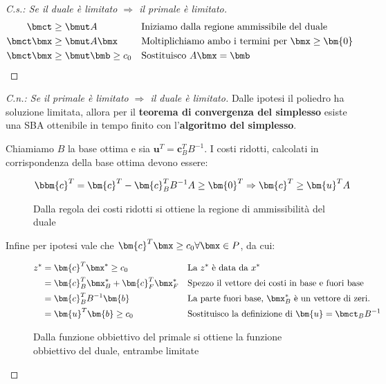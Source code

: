 \documentclass[\main/main.tex]{subfiles}
\begin{document}
\begin{proof}[C.s.: Se il duale è limitato $\Rightarrow$ il primale è limitato]
  \begin{align*}
    \bmct     & \geq \bmut A             &  & \text{Iniziamo dalla regione ammissibile del duale}         \\
    \bmct\bmx & \geq \bmut A\bmx         &  & \text{Moltiplichiamo ambo i termini per $\bmx \geq \bm{0}$} \\
    \bmct\bmx & \geq \bmut \bmb \geq c_0 &  & \text{Sostituisco $A\bmx = \bmb$}
  \end{align*}
\end{proof}
\begin{proof}[C.n.: Se il primale è limitato $\Rightarrow$ il duale è limitato]

  Dalle ipotesi il poliedro ha soluzione limitata, allora per il \textbf{teorema di convergenza del simplesso} esiste una SBA ottenibile in tempo finito con l'\textbf{algoritmo del simplesso}.

  Chiamiamo $B$ la base ottima e sia $\bm{u}^T = \bm{c}^T_B B^{-1}$. I costi ridotti, calcolati in corrispondenza della base ottima devono essere:

  \begin{figure}
    \[
      \bbm{c}^T = \bm{c}^T - \bm{c}_B^TB^{-1}A \geq \bm{0}^T \Rightarrow \bm{c}^T \geq \bm{u}^TA
    \]
    \caption{Dalla regola dei costi ridotti si ottiene la regione di ammissibilità del duale}
  \end{figure}

  Infine per ipotesi vale che $\bm{c}^T \bmx \geq c_0 \forall \bmx \in P$, da cui:

  \begin{figure}
    \begin{align*}
      z^* & = \bm{c}^T\bmx^* \geq c_0                   &  & \text{La $z^*$ è data da $x^*$}                                \\
          & = \bm{c}_B^T \bmx^*_B + \bm{c}_F^T \bmx^*_F &  & \text{Spezzo il vettore dei costi in base e fuori base}        \\
          & = \bm{c}_B^TB^{-1}\bm{b}                    &  & \text{La parte fuori base, $\bmx^*_B$ è un vettore di zeri.}   \\
          & = \bm{u}^T\bm{b}  \geq c_0                  &  & \text{Sostituisco la definizione di $\bm{u} = \bmct_B B^{-1}$}
    \end{align*}
    \caption{Dalla funzione obbiettivo del primale si ottiene la funzione obbiettivo del duale, entrambe limitate}
  \end{figure}

\end{proof}
\end{document}
